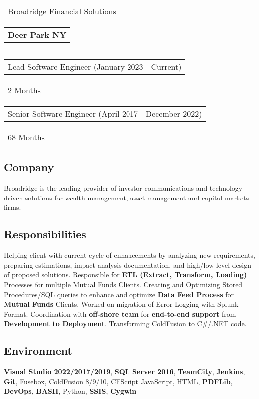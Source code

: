 \documentclass[letterpaper,11pt]{article}
\begin{document}

    \vspace{0.64cm}
    \noindent
    \begin{tabular}[t]{@{}l}
    \Large{Broadridge Financial Solutions}
    \end{tabular}
    \hfill
    \begin{tabular}[t]{l@{}}
    \textbf{Deer Park NY}
    \end{tabular}
    \noindent\rule{\textwidth}{0.5pt}
    \begin{tabular}[t]{@{}l}
    Lead Software Engineer (January 2023 - Current)
    \end{tabular}
    \hfill
    \begin{tabular}[t]{l@{}}
    2 Months
    \end{tabular}
    \begin{tabular}[t]{@{}l}
    Senior Software Engineer (April 2017 - December 2022)
    \end{tabular}
    \hfill
    \begin{tabular}[t]{l@{}}
    68 Months
    \end{tabular}

    \subsection{Company}
    Broadridge is the leading provider of investor communications and technology-driven solutions for wealth management, asset management and capital markets firms.

    \subsection{Responsibilities}
    Helping client with current cycle of enhancements by analyzing new requirements, preparing estimations, impact analysis documentation, and high/low level design of proposed solutions. Responsible for \textbf{ETL (Extract, Transform, Loading)} Processes for multiple Mutual Funds Clients. Creating and Optimizing Stored Procedures/SQL queries to enhance and optimize \textbf{Data Feed Process} for \textbf{Mutual Funds} Clients. Worked on migration of Error Logging with Splunk Format. Coordination with \textbf{off-shore team} for \textbf{end-to-end support} from \textbf{Development to Deployment}. Transforming ColdFusion to C\#/.NET code.

    \subsection{Environment}
    \textbf{Visual Studio 2022/2017/2019}, \textbf{SQL Server 2016}, \textbf{TeamCity}, \textbf{Jenkins}, \textbf{Git}, Fusebox,  ColdFusion 8/9/10, CFScript JavaScript, HTML, \textbf{PDFLib}, \textbf{DevOps}, \textbf{BASH}, Python, \textbf{SSIS}, \textbf{Cygwin}
\end{document}
